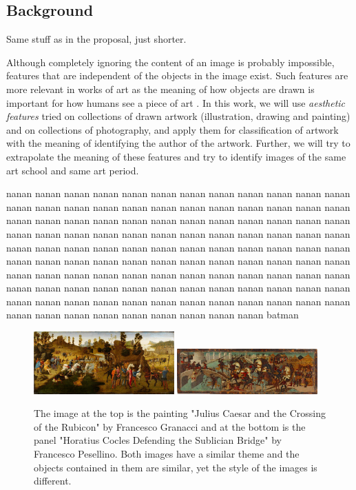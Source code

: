 \documentclass[11pt,a4paper]{report}
\begin{document}
\begin{multicols}{2}

\section{Background}

Same stuff as in the proposal, just shorter.

Although completely ignoring the content of an image is probably impossible,
features that are independent of the objects in the image exist.  Such features
are more relevant in works of art \cite{zirnhelt07art} as the meaning of how
objects are drawn is important for how humans see a piece of art
\cite{mach10clas}.  In this work, we will use \emph{aesthetic features} tried
on collections of drawn artwork (illustration, drawing and painting) and on
collections of photography, and apply them for classification of artwork with
the meaning of identifying the author of the artwork.  Further, we will try to
extrapolate the meaning of these features and try to identify images of the
same art school and same art period.

nanan nanan nanan nanan nanan nanan nanan nanan nanan nanan nanan nanan nanan
nanan nanan nanan nanan nanan nanan nanan nanan nanan nanan nanan nanan nanan
nanan nanan nanan nanan nanan nanan nanan nanan nanan nanan nanan nanan nanan
nanan nanan nanan nanan nanan nanan nanan nanan nanan nanan nanan nanan nanan
nanan nanan nanan nanan nanan nanan nanan nanan nanan nanan nanan nanan nanan
nanan nanan nanan nanan nanan nanan nanan nanan nanan nanan nanan nanan nanan
nanan nanan nanan nanan nanan nanan nanan nanan nanan nanan nanan nanan nanan
nanan nanan nanan nanan nanan nanan nanan nanan nanan nanan nanan nanan nanan
nanan nanan nanan nanan nanan nanan nanan nanan nanan nanan nanan nanan nanan
batman

\begin{figure}[tb]  %
\centering
\includegraphics[width=0.48\textwidth]{diff_caesar}
\includegraphics[width=0.48\textwidth]{diff_horatius}
\caption[Example of different styles]{The image at the top is the painting
"Julius Caesar and the Crossing of the Rubicon" by Francesco Granacci and at
the bottom is the panel "Horatius Cocles Defending the Sublician Bridge" by
Francesco Pesellino.  Both images have a similar theme and the objects
contained in them are similar, yet the style of the images is different.}
\label{diff}
\end{figure}


\end{multicols}
\end{document}
